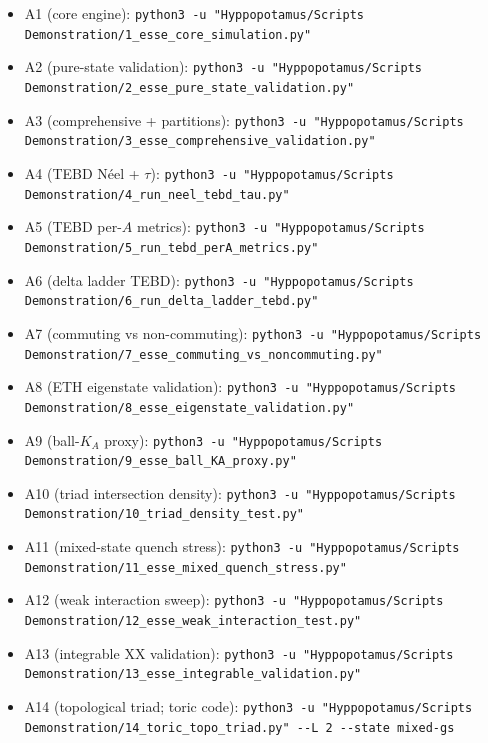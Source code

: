 \documentclass[10pt]{article}
\begin{document}
\begin{itemize}
  \item A1 (core engine):\newline
  \verb|python3 -u "Hyppopotamus/Scripts Demonstration/1_esse_core_simulation.py"|
  \item A2 (pure-state validation):\newline
  \verb|python3 -u "Hyppopotamus/Scripts Demonstration/2_esse_pure_state_validation.py"|
  \item A3 (comprehensive + partitions):\newline
  \verb|python3 -u "Hyppopotamus/Scripts Demonstration/3_esse_comprehensive_validation.py"|
  \item A4 (TEBD Néel + $\tau$):\newline
  \verb|python3 -u "Hyppopotamus/Scripts Demonstration/4_run_neel_tebd_tau.py"|
  \item A5 (TEBD per-$A$ metrics):\newline
  \verb|python3 -u "Hyppopotamus/Scripts Demonstration/5_run_tebd_perA_metrics.py"|
  \item A6 (delta ladder TEBD):\newline
  \verb|python3 -u "Hyppopotamus/Scripts Demonstration/6_run_delta_ladder_tebd.py"|
  \item A7 (commuting vs non-commuting):\newline
  \verb|python3 -u "Hyppopotamus/Scripts Demonstration/7_esse_commuting_vs_noncommuting.py"|
  \item A8 (ETH eigenstate validation):\newline
  \verb|python3 -u "Hyppopotamus/Scripts Demonstration/8_esse_eigenstate_validation.py"|
  \item A9 (ball-$K_A$ proxy):\newline
  \verb|python3 -u "Hyppopotamus/Scripts Demonstration/9_esse_ball_KA_proxy.py"|
  \item A10 (triad intersection density):\newline
  \verb|python3 -u "Hyppopotamus/Scripts Demonstration/10_triad_density_test.py"|
  \item A11 (mixed-state quench stress):\newline
  \verb|python3 -u "Hyppopotamus/Scripts Demonstration/11_esse_mixed_quench_stress.py"|
  \item A12 (weak interaction sweep):\newline
  \verb|python3 -u "Hyppopotamus/Scripts Demonstration/12_esse_weak_interaction_test.py"|
  \item A13 (integrable XX validation):\newline
  \verb|python3 -u "Hyppopotamus/Scripts Demonstration/13_esse_integrable_validation.py"|
    \item A14 (topological triad; toric code):\newline
  \verb|python3 -u "Hyppopotamus/Scripts Demonstration/14_toric_topo_triad.py" --L 2 --state mixed-gs|
\end{itemize}
\end{document}
